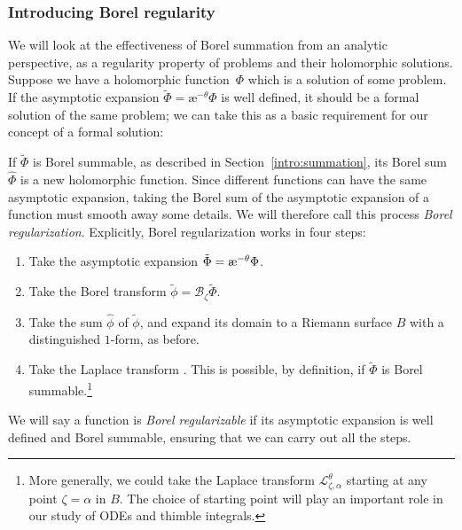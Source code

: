 \documentclass[pdftex]{sigma}
\newcommand{\series}[1]{\tilde{#1}}
\newcommand{\laplace}{\mathcal{L}}
\newcommand{\borel}{\mathcal{B}}
\newcommand{\aexp}{\text{\rm \ae}}
\numberwithin{equation}{section}
\begin{document}
\subsubsection{Introducing Borel regularity}
%
We will look at the effectiveness of Borel summation from an analytic perspective, as a regularity property of problems and their holomorphic solutions. Suppose we have a holomorphic function~$\Phi$ which is a solution of some problem. If the asymptotic expansion $\series{\Phi} = \text{\ae}^{-\theta} \Phi$ is well defined, it should be a formal solution of the same problem; we can take this as a basic requirement for our concept of a formal solution:
\begin{center}
\end{center}
If $\series{\Phi}$ is Borel summable, as described in Section~\ref{intro:summation}, its Borel sum $\hat{\Phi}$ is a new holomorphic function.
Since different functions can have the same asymptotic expansion, taking the Borel sum of the asymptotic expansion of a function must smooth away some details. We will therefore call this process {\em Borel regularization}. Explicitly, Borel regularization works in four steps:
\begin{enumerate}\itemsep=0pt
\item[(1)] Take the asymptotic expansion $\series{\Phi} = \aexp^{-\theta} \Phi$.
\item[(2)] Take the Borel transform $\series{\phi} = \borel_\zeta \series{\Phi}$.
\item[(3)] Take the sum $\hat{\phi}$ of $\series{\phi}$, and expand its domain to a Riemann surface $B$ with a distinguished $1$-form, as before.
\item[(4)] Take the Laplace transform \smash{$\hat{\Phi} = \laplace_{\zeta, 0}^\theta \hat{\phi}$}. This is possible, by definition, if $\series{\Phi}$ is Borel summable.\footnote{More generally, we could take the Laplace transform $\laplace^\theta_{\zeta, \alpha}$ starting at any point $\zeta = \alpha$ in $B$. The choice of starting point will play an important role in our study of ODEs and thimble integrals.}
\end{enumerate}
We will say a function is {\em Borel regularizable} if its asymptotic expansion is well defined and Borel summable, ensuring that we can carry out all the steps.
\end{document}
